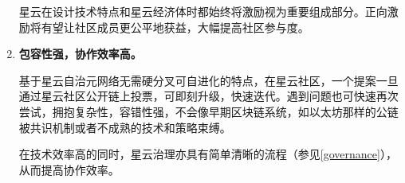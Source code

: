 \begin{enumerate}
	星云在设计技术特点和星云经济体时都始终将激励视为重要组成部分。正向激励将有望让社区成员更公平地获益，大幅提高社区参与度。
	
	\item 

	\textbf{包容性强，协作效率高。}
	
	基于星云自治元网络无需硬分叉可自进化的特点，在星云社区，一个提案一旦通过星云社区公开链上投票，可即刻升级，快速迭代。遇到问题也可快速再次尝试，拥抱复杂性，容错性强，不会像早期区块链系统，如以太坊那样的公链被共识机制或者不成熟的技术和策略束缚。

	在技术效率高的同时，星云治理亦具有简单清晰的流程（参见\ref{governance}），从而提高协作效率。

\end{enumerate}
